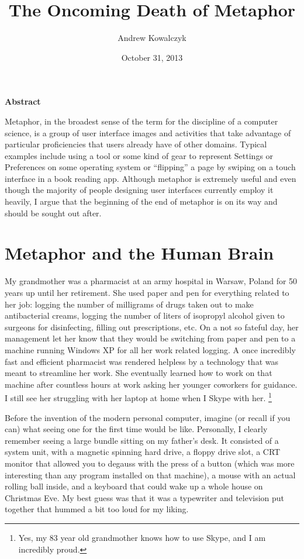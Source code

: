 \documentclass[11pt, oneside]{article}   	%
\title{The Oncoming Death of Metaphor}
\author{Andrew Kowalczyk}
\date{October 31, 2013}							%
\begin{document}
\maketitle
\centerline{\textbf{Abstract}}
Metaphor, in the broadest sense of the term for the discipline of a computer science, is a group of user interface images and activities that take advantage of particular proficiencies that users already have of other domains. Typical examples include using a tool or some kind of gear to represent Settings or Preferences on some operating system or ``flipping'' a page by swiping on a touch interface in a book reading app. Although metaphor is extremely useful and even though the majority of people designing user interfaces currently employ it heavily, I argue that the beginning of the end of metaphor is on its way and should be sought out after.

\pagebreak
\section{Metaphor and the Human Brain} 
My grandmother was a pharmacist at an army hospital in Warsaw, Poland for 50 years up until her retirement. She used paper and pen for everything related to her job: logging the number of milligrams of drugs taken out to make antibacterial creams, logging the number of liters of isopropyl alcohol given to surgeons for disinfecting, filling out prescriptions, etc. On a not so fateful day, her management let her know that they would be switching from paper and pen to a machine running Windows XP for all her work related logging. A once incredibly fast and efficient pharmacist was rendered helpless by a technology that was meant to streamline her work. She eventually learned how to work on that machine after countless hours at work asking her younger coworkers for guidance. I still see her struggling with her laptop at home when I Skype with her. \footnote{Yes, my 83 year old grandmother knows how to use Skype, and I am incredibly proud.}

Before the invention of the modern personal computer, imagine (or recall if you can) what seeing one for the first time would be like.
Personally, I clearly remember seeing a large bundle sitting on my father's desk. It consisted of a system unit, with a magnetic spinning hard drive, a floppy drive slot, a CRT monitor that allowed you to degauss with the press of a button (which was more interesting than any program installed on that machine), a mouse with an actual rolling ball inside, and a keyboard that could wake up a whole house on Christmas Eve. My best guess was that it was a typewriter and television put together that hummed a bit too loud for my liking.
\end{document}
